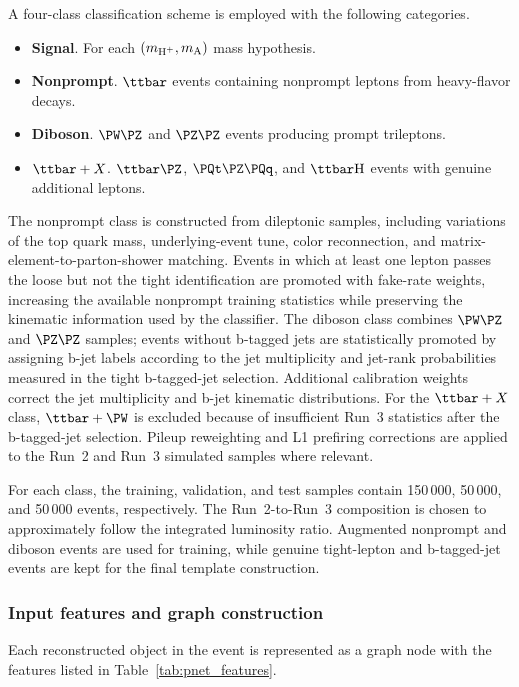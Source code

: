A four-class classification scheme is employed with the following categories.
\begin{itemize}
\item \textbf{Signal}. For each $(m_{\text{H}^+}, m_{\text{A}})$ mass hypothesis.
\item \textbf{Nonprompt}. $\ttbar$ events containing nonprompt leptons from heavy-flavor decays.
\item \textbf{Diboson}. $\PW\PZ$ and $\PZ\PZ$ events producing prompt trileptons.
\item \textbf{$\ttbar+X$}. $\ttbar\PZ$, $\PQt\PZ\PQq$, and $\ttbar\PH$ events with genuine additional leptons.
\end{itemize}
The nonprompt class is constructed from dileptonic \ttbar samples, including variations of the top quark mass, underlying-event tune, color reconnection, and matrix-element-to-parton-shower matching. Events in which at least one lepton passes the loose but not the tight identification are promoted with fake-rate weights, increasing the available nonprompt training statistics while preserving the kinematic information used by the classifier. The diboson class combines $\PW\PZ$ and $\PZ\PZ$ samples; events without b-tagged jets are statistically promoted by assigning b-jet labels according to the jet multiplicity and jet-\pT rank probabilities measured in the tight b-tagged-jet selection. Additional calibration weights correct the jet multiplicity and b-jet kinematic distributions. For the $\ttbar+X$ class, $\ttbar+\PW$ is excluded because of insufficient Run~3 statistics after the b-tagged-jet selection. Pileup reweighting and L1 prefiring corrections are applied to the Run~2 and Run~3 simulated samples where relevant.

For each class, the training, validation, and test samples contain 150\,000, 50\,000, and 50\,000 events, respectively. The Run~2-to-Run~3 composition is chosen to approximately follow the integrated luminosity ratio. Augmented nonprompt and diboson events are used for training, while genuine tight-lepton and b-tagged-jet events are kept for the final template construction.

\subsubsection{Input features and graph construction}

Each reconstructed object in the event is represented as a graph node with the features listed in Table~\ref{tab:pnet_features}.

